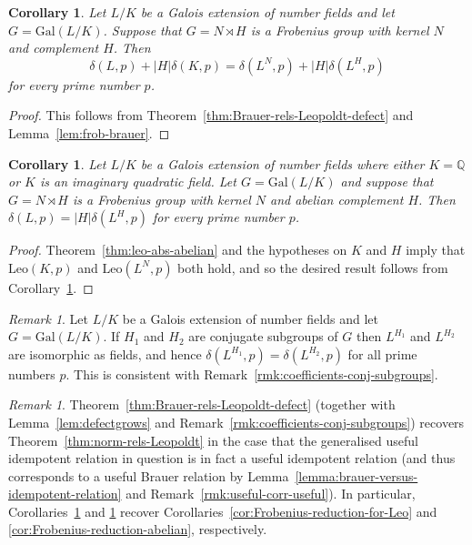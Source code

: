 \documentclass[12pt]{amsart}
\theoremstyle{plain}
\newtheorem{corollary}[theorem]{Corollary}
\theoremstyle{remark}
\newtheorem{remark}[theorem]{Remark}
\theoremstyle{definition}
\newcommand{\Q}{\mathbb{Q}}
\newcommand{\Gal}{\mathrm{Gal}}
\newcommand{\Leo}{\mathrm{Leo}}
\numberwithin{equation}{section}
\begin{document}
\begin{corollary}\label{cor:frob-defects}
Let $L/K$ be a Galois extension of number fields and let $G=\Gal(L/K)$.  
Suppose that $G = N \rtimes H$ is a Frobenius group with kernel $N$ and complement $H$.
Then
\[
\delta(L,p) + |H|\delta(K,p) = \delta(L^{N},p) + |H|\delta(L^{H},p)
\] 
for every prime number $p$.
\end{corollary}

\begin{proof}
This follows from Theorem~\ref{thm:Brauer-rels-Leopoldt-defect} and Lemma~\ref{lem:frob-brauer}.
\end{proof}

\begin{corollary}\label{cor:Frobenius-defects-abelian}
Let $L/K$ be a Galois extension of number fields where either
$K=\Q$ or $K$ is an imaginary quadratic field.
Let $G=\Gal(L/K)$ and
suppose that $G = N \rtimes H$ is a Frobenius group with kernel $N$ and abelian complement $H$.
Then
$\delta(L,p) = |H|\delta(L^{H},p)$ 
for every prime number $p$.
\end{corollary}

\begin{proof}
Theorem~\ref{thm:leo-abs-abelian} and the hypotheses on $K$ and $H$ imply that $\Leo(K,p)$ and 
$\Leo(L^{N},p)$ both hold,
and so the desired result follows from Corollary~\ref{cor:frob-defects}. 
\end{proof}

\begin{remark}
Let $L/K$ be a Galois extension of number fields and let $G=\Gal(L/K)$.  
If $H_{1}$ and $H_{2}$ are conjugate subgroups of $G$ then $L^{H_{1}}$ and $L^{H_{2}}$
are isomorphic as fields, and hence $\delta(L^{H_{1}},p)=\delta(L^{H_{2}},p)$ for all prime numbers $p$. This is consistent with Remark~\ref{rmk:coefficients-conj-subgroups}.
\end{remark}

\begin{remark}
Theorem~\ref{thm:Brauer-rels-Leopoldt-defect} (together with Lemma~\ref{lem:defectgrows}  
and Remark~\ref{rmk:coefficients-conj-subgroups})
recovers Theorem~\ref{thm:norm-rels-Leopoldt}
in the case that the generalised useful idempotent relation in question is in fact a useful idempotent relation (and thus corresponds to a useful Brauer relation by Lemma~\ref{lemma:brauer-versus-idempotent-relation} and 
Remark~\ref{rmk:useful-corr-useful}). 
In particular, Corollaries~\ref{cor:frob-defects} and \ref{cor:Frobenius-defects-abelian}
recover Corollaries~\ref{cor:Frobenius-reduction-for-Leo} and \ref{cor:Frobenius-reduction-abelian}, respectively.
\end{remark}
\end{document}

